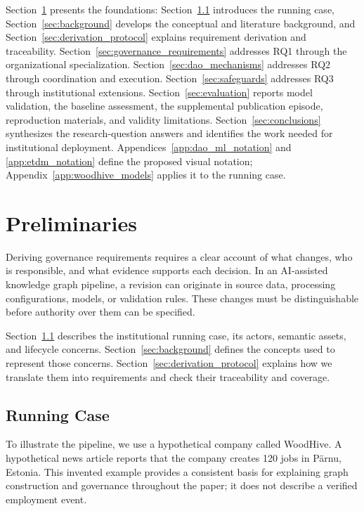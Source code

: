 \documentclass[journal]{IEEEtran}
\begin{document}
Section~\ref{sec:preliminaries} presents the foundations:
Section~\ref{sec:runningcase} introduces the running case,
Section~\ref{sec:background} develops the conceptual and
literature background, and Section~\ref{sec:derivation_protocol}
explains requirement derivation and traceability.
Section~\ref{sec:governance_requirements} addresses RQ1 through
the organizational specialization.
Section~\ref{sec:dao_mechanisms} addresses RQ2 through
coordination and execution.
Section~\ref{sec:safeguards} addresses RQ3 through institutional
extensions. Section~\ref{sec:evaluation} reports model validation,
the baseline assessment, the supplemental publication episode,
reproduction materials, and validity limitations.
Section~\ref{sec:conclusions} synthesizes the research-question
answers and identifies the work needed for institutional
deployment. Appendices~\ref{app:dao_ml_notation} and
\ref{app:etdm_notation} define the proposed visual notation;
Appendix~\ref{app:woodhive_models} applies it to the running case.

\section{Preliminaries}
\label{sec:preliminaries}

Deriving governance requirements requires a clear account of
what changes, who is responsible, and what evidence supports
each decision. In an AI-assisted knowledge graph pipeline,
a revision can originate in source data, processing configurations,
models, or validation rules. These changes must be distinguishable
before authority over them can be specified.

Section~\ref{sec:runningcase} describes the institutional running case,
its actors, semantic assets, and lifecycle concerns.
Section~\ref{sec:background} defines the concepts used to
represent those concerns. Section~\ref{sec:derivation_protocol}
explains how we translate them into requirements and check
their traceability and coverage.

\subsection{Running Case}
\label{sec:runningcase}

To illustrate the pipeline, we use a hypothetical company
called WoodHive. A hypothetical news article reports that
the company creates 120 jobs in Pärnu, Estonia. This invented
example provides a consistent basis for explaining graph
construction and governance throughout the paper; it does
not describe a verified employment event.
\end{document}
